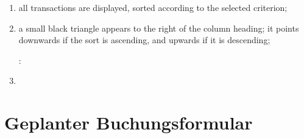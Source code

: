 \begin{enumerate}
	\item all transactions are displayed, sorted according to the selected criterion;
	\item a small black triangle appears to the right of the column heading; it points downwards if the sort is ascending, and upwards if it is descending;
	
	\Note{}: 
	
	\item 
\end{enumerate}


\section{Geplanter Buchungsformular\label{plannedtransactions-form}}

